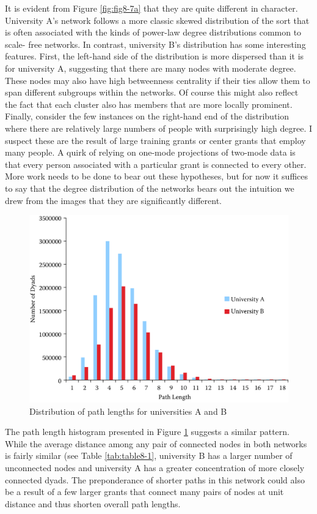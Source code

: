 \documentclass[]{krantz}
\begin{document}
It is evident from Figure \ref{fig:fig8-7a} that they are quite
different in character. University A's network follows a more classic
skewed distribution of the sort that is often associated with the kinds
of power-law degree distributions common to scale- free networks. In
contrast, university B's distribution has some interesting features.
First, the left-hand side of the distribution is more dispersed than it
is for university A, suggesting that there are many nodes with moderate
degree. These nodes may also have high betweenness centrality if their
ties allow them to span different subgroups within the networks. Of
course this might also reflect the fact that each cluster also has
members that are more locally prominent. Finally, consider the few
instances on the right-hand end of the distribution where there are
relatively large numbers of people with surprisingly high degree. I
suspect these are the result of large training grants or center grants
that employ many people. A quirk of relying on one-mode projections of
two-mode data is that every person associated with a particular grant is
connected to every other. More work needs to be done to bear out these
hypotheses, but for now it suffices to say that the degree distribution
of the networks bears out the intuition we drew from the images that
they are significantly different.

\begin{figure}

{\centering \includegraphics[width=0.7\linewidth]{ChapterNetworks/figures/fig8-8} 

}

\caption{Distribution of path lengths for universities A and B}\label{fig:fig8-8}
\end{figure}

The path length histogram presented in Figure \ref{fig:fig8-8} suggests
a similar pattern. While the average distance among any pair of
connected nodes in both networks is fairly similar (see Table
\ref{tab:table8-1}, university B has a larger number of unconnected
nodes and university A has a greater concentration of more closely
connected dyads. The preponderance of shorter paths in this network
could also be a result of a few larger grants that connect many pairs of
nodes at unit distance and thus shorten overall path lengths.
\end{document}
